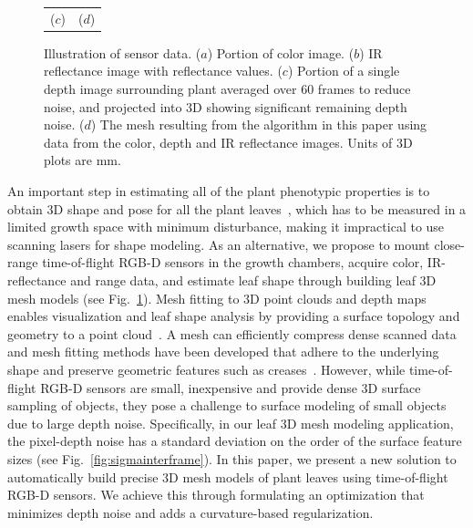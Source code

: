 \begin{figure}
\begin{center}
\begin{tabular}{ c c }
($c$) & ($d$) \\
\end{tabular}
\end{center}
\caption{Illustration of sensor data.  ($a$) Portion of color image. ($b$) IR reflectance image with reflectance values. ($c$) Portion of a single depth image surrounding plant averaged over 60 frames to reduce noise, and projected into $3$D showing significant remaining depth noise. ($d$)  The mesh resulting from the algorithm in this paper using data from the color, depth and IR reflectance images.  Units of $3$D plots are mm.  }
\label{fig:plantnoise}
\end{figure}


An important step in estimating all of the plant phenotypic properties is to obtain $3$D shape and pose for all the plant leaves~\cite{muller2015leaf}, which has to be measured in a limited growth space with minimum disturbance, making it impractical to use scanning lasers for shape modeling. As an alternative, we propose to mount close-range time-of-flight RGB-D sensors in the growth chambers, acquire color, IR-reflectance and range data, and estimate leaf shape through building leaf $3$D mesh models (see Fig.~\ref{fig:plantnoise}). Mesh fitting to $3$D point clouds and depth maps enables visualization and leaf shape analysis by providing a surface topology and geometry to a point cloud~\cite{Sienz2000,Yeh2011}.  A mesh can efficiently compress dense scanned data and mesh fitting methods have been developed that adhere to the underlying shape and preserve geometric features such as creases~\cite{Hoppe1994,Kobbelt:1998}. 
%
However, while time-of-flight RGB-D sensors are small, inexpensive and provide dense $3$D surface sampling of objects, they pose a challenge to surface modeling of small objects due to large depth noise. Specifically, in our leaf $3$D mesh modeling application, the pixel-depth noise has a standard deviation on the order of the surface feature sizes (see Fig.~\ref{fig:sigmainterframe}). In this paper, we present a new solution to automatically build precise $3$D mesh models of plant leaves using time-of-flight RGB-D sensors. We achieve this through formulating an optimization that minimizes depth noise and adds a curvature-based regularization.  


